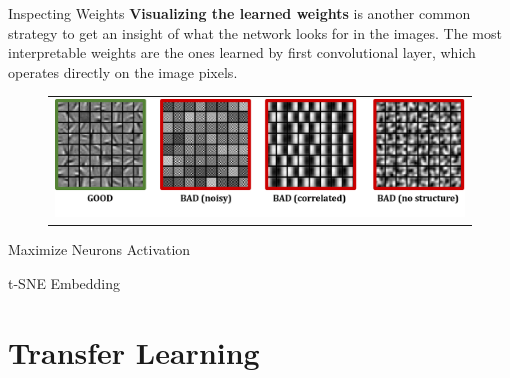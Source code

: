 \documentclass[aspectratio=169]{beamer}
\begin{document}
\begin{frame}{Inspecting Weights}
\textbf{Visualizing the learned weights} is another common strategy to get an insight of what the network looks for in the images. The most interpretable weights are the ones learned by first convolutional layer, which operates directly on the image pixels.
\begin{figure}
\begin{tabular}{c}
\includegraphics[width=\textwidth]{img/cnn/weights_inspection.png}
\end{tabular}
\end{figure}

\end{frame}


\begin{frame}{Maximize Neurons Activation}

\end{frame}


\begin{frame}{t-SNE Embedding}

\end{frame}


\section{Transfer Learning}

\end{document}
